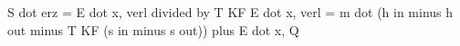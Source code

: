 S dot erz = E dot x, verl divided by T KF  
E dot x, verl = m dot (h in minus h out minus T KF (s in minus s out)) plus E dot x, Q
